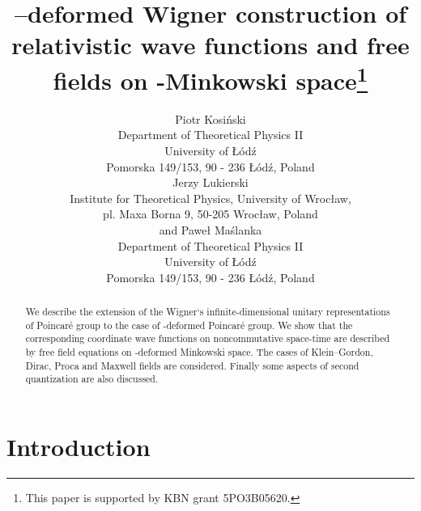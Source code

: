 \documentclass[a4paper,a4paper]{article}
\begin{document}
\title{\myHighlight{$\kappa$}\coordHE{}--deformed Wigner construction of
 relativistic   wave functions and  free fields
 on \myHighlight{$\kappa$}\coordHE{}-Minkowski space\thanks{
This paper is    supported by KBN grant 5PO3B05620.}}

\author{
Piotr Kosi\'nski
\\
Department of Theoretical Physics II \\
University of {\L}\'od\'z \\
Pomorska 149/153, 90 - 236 {\L}\'{o}d\'{z}, Poland
\\
Jerzy Lukierski
\\
Institute for
Theoretical Physics, University of Wroc{\l}aw,\\
pl. Maxa Borna 9, 50-205 Wroc{\l}aw, Poland  
\\
 and Pawe{\l} Ma\'{s}lanka
\\
Department of Theoretical Physics II \\            
University of {\L}\'od\'z \\                        
Pomorska 149/153, 90 - 236 {\L}\'{o}d\'{z}, Poland
}

\date{}		
\maketitle
\begin{abstract}
We describe the extension of the Wigner`s infinite-dimensional
unitary representations of Poincar\'{e} group to the case of
\myHighlight{$\kappa$}\coordHE{}-deformed  Poincar\'{e} group. We show that the
corresponding coordinate wave functions on noncommutative
space-time are described by free field equations on
\myHighlight{$\kappa$}\coordHE{}-deformed Minkowski space.
 The cases of Klein--Gordon, Dirac, Proca and Maxwell fields are considered.
 Finally some aspects of second quantization are also discussed.
\end{abstract}



\section{Introduction}
\end{document}
